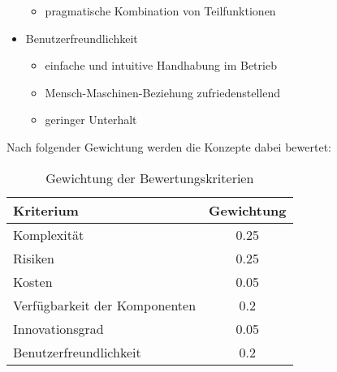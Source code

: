 \begin{itemize}
\begin{itemize}
	\item pragmatische Kombination von Teilfunktionen
	\end{itemize}

	\item Benutzerfreundlichkeit
	\begin{itemize}
	\item einfache und intuitive Handhabung im Betrieb	
		
	\item Mensch-Maschinen-Beziehung zufriedenstellend
	
	\item geringer Unterhalt
	
	\end{itemize}

\end{itemize}

Nach folgender Gewichtung werden die Konzepte dabei bewertet:
\begin{table}[H]
	\begin{tabular}{|l|c|}
	\hline 
	\textbf{Kriterium} & \textbf{Gewichtung} \\ 
	\hline 
	Komplexität & 0.25 \\ 
	\hline 
	Risiken & 0.25 \\ 
	\hline 
	Kosten & 0.05 \\ 
	\hline 
	Verfügbarkeit der Komponenten & 0.2 \\ 
	\hline 
	Innovationsgrad & 0.05 \\ 
	\hline 
	Benutzerfreundlichkeit & 0.2 \\ 
	\hline 
	\end{tabular} 
	\caption{Gewichtung der Bewertungskriterien}
	\label{tab:gewichtung}
\end{table}

